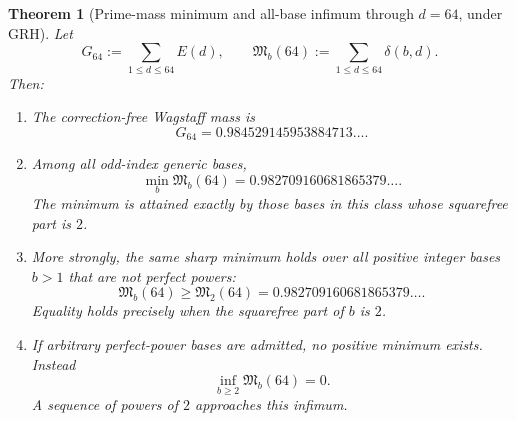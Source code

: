 \documentclass[11pt]{article}
\newtheorem{theorem}{Theorem}[section]
\begin{document}
\begin{theorem}[Prime-mass minimum and all-base infimum through $d=64$, under GRH]
\label{thm:prime-mass-64}
Let
\[
G_{64}:=\sum_{1\le d\le64}E(d),
\qquad
\mathfrak M_b(64):=\sum_{1\le d\le64}\delta(b,d).
\]
Then:
\begin{enumerate}[label=(\roman*)]
\item The correction-free Wagstaff mass is
\[
G_{64}=0.984529145953884713\ldots .
\]

\item Among all odd-index generic bases,
\[
\min_b\mathfrak M_b(64)
=0.982709160681865379\ldots .
\]
The minimum is attained exactly by those bases in this class whose squarefree
part is $2$.

\item More strongly, the same sharp minimum holds over all positive integer
bases $b>1$ that are not perfect powers:
\[
\mathfrak M_b(64)\ge\mathfrak M_2(64)
=0.982709160681865379\ldots .
\]
Equality holds precisely when the squarefree part of $b$ is $2$.

\item If arbitrary perfect-power bases are admitted, no positive minimum
exists.  Instead
\[
\inf_{b\ge2}\mathfrak M_b(64)=0.
\]
A sequence of powers of $2$ approaches this infimum.
\end{enumerate}
\end{theorem}
\end{document}
